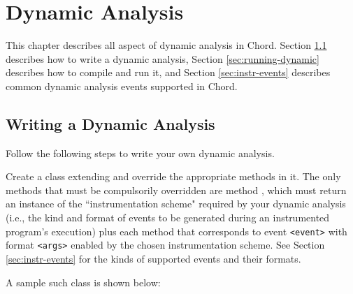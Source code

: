 \chapter{Dynamic Analysis}
\label{chap:dynamic}

This chapter describes all aspect of dynamic analysis in Chord.  Section
\ref{sec:writing-dynamic} describes how to write a dynamic analysis, Section
\ref{sec:running-dynamic} describes how to compile and run it, and Section
\ref{sec:instr-events} describes common dynamic analysis events supported in
Chord.

\section{Writing a Dynamic Analysis}
\label{sec:writing-dynamic}

Follow the following steps to write your own dynamic analysis.

Create a class extending  and override
the appropriate methods in it.
The only methods that must be compulsorily overridden are method ,
which must return an instance of the ``instrumentation scheme" required by
your dynamic analysis (i.e., the kind and format of events to be generated during an
instrumented program's execution)
plus each  method that corresponds to event {\tt <event>}
with format {\tt <args>} enabled by the chosen instrumentation scheme.
See Section \ref{sec:instr-events} for the kinds of supported events and their formats.

A sample such class  is shown below:

\texonly{\newpage}

